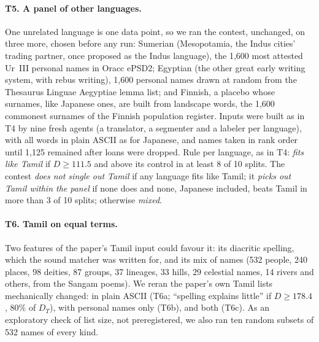 \documentclass[11pt,a4paper]{article}
\begin{document}
\paragraph{T5. A panel of other languages.} One unrelated language is one data point, so we ran the contest, unchanged, on three more, chosen before any run: Sumerian (Mesopotamia, the Indus cities' trading partner, once proposed as the Indus language), the 1,600 most attested Ur~III personal names in Oracc ePSD2; Egyptian (the other great early writing system, with rebus writing), 1,600 personal names drawn at random from the Thesaurus Linguae Aegyptiae lemma list; and Finnish, a placebo whose surnames, like Japanese ones, are built from landscape words, the 1,600 commonest surnames of the Finnish population register. Inputs were built as in T4 by nine fresh agents (a translator, a segmenter and a labeler per language), with all words in plain ASCII as for Japanese, and names taken in rank order until 1,125 remained after loans were dropped. Rule per language, as in T4: \emph{fits like Tamil} if $D\ge111.5$ and above its control in at least 8 of 10 splits. The contest \emph{does not single out Tamil} if any language fits like Tamil; it \emph{picks out Tamil within the panel} if none does and none, Japanese included, beats Tamil in more than 3 of 10 splits; otherwise \emph{mixed}.

\paragraph{T6. Tamil on equal terms.} Two features of the paper's Tamil input could favour it: its diacritic spelling, which the sound matcher was written for, and its mix of names (532 people, 240 places, 98 deities, 87 groups, 37 lineages, 33 hills, 29 celestial names, 14 rivers and others, from the Sangam poems). We reran the paper's own Tamil lists mechanically changed: in plain ASCII (T6a; ``spelling explains little'' if $D\ge178.4$, 80\% of $D_T$), with personal names only (T6b), and both (T6c). As an exploratory check of list size, not preregistered, we also ran ten random subsets of 532 names of every kind.
\end{document}
